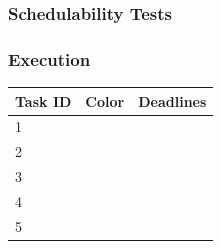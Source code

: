 \documentclass[xcolor=table]{beamer}
\begin{document}
\begin{frame}
\frametitle{Schedulability Tests}

\end{frame}

\begin{frame}
\frametitle{Execution}

\begin{table}[]
\begin{tabular}{|l|l|l|}
\hline
Task ID & Color                    & Deadlines \\ \hline
1       & \cellcolor[HTML]{FFCC67} &  \\ \hline
2       & \cellcolor[HTML]{FFC702} & \\ \hline
3       & \cellcolor[HTML]{6200C9} & \\ \hline
4       & \cellcolor[HTML]{303498} & \\ \hline
5       & \cellcolor[HTML]{FD6864} & \\ \hline
\end{tabular}
\end{table}

\begin{table}[]
\end{table}

\end{frame}
\end{document}

